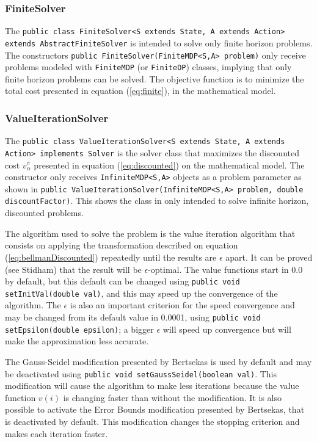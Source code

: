 \documentclass[11pt]{article}
\begin{document}
\subsubsection{FiniteSolver}

The \lstinline!public class FiniteSolver<S extends State, A extends Action> extends AbstractFiniteSolver! is intended to solve only finite horizon problems. The constructors \lstinline!public FiniteSolver(FiniteMDP<S,A> problem)!  only receive problems modeled with \lstinline!FiniteMDP! (or \lstinline!FiniteDP!) classes, implying that only finite horizon problems can be solved. The objective function is to minimize the total cost presented in equation (\ref{eq:finite}), in the mathematical model.

\subsubsection{ValueIterationSolver}

The \lstinline!public class ValueIterationSolver<S extends State, A extends Action> implements Solver! is the solver class that maximizes the discounted cost $v_\alpha^{\pi}$ presented in equation (\ref{eq:discounted}) on the mathematical model. The constructor  only receives \lstinline!InfiniteMDP<S,A>! objects as a problem parameter as shown in \lstinline!public ValueIterationSolver(InfiniteMDP<S,A> problem, double discountFactor)!. This shows the class in only intended to solve infinite horizon, discounted problems.

The algorithm used to solve the problem is the value iteration algorithm that consists on applying the transformation described on equation (\ref{eq:bellmanDiscounted}) repeatedly until the results are $\epsilon$ apart. It can be proved (see Stidham\cite{stidham}) that the result will be $\epsilon$-optimal. The value functions start in 0.0 by default, but this default can be changed using \lstinline!public void setInitVal(double val)!, and this may speed up the convergence of the algorithm. The $\epsilon$ is also an important criterion for the speed convergence and may be changed from its default value in 0.0001, using \lstinline!public void setEpsilon(double epsilon)!; a bigger $\epsilon$ will speed up convergence but will make the approximation less accurate.

The Gauss-Seidel modification presented by Bertsekas\cite{bertsekas} is used by default and may be deactivated using \lstinline!public void setGaussSeidel(boolean val)!. This modification will cause the algorithm to make less iterations because the value function $v(i)$ is changing faster than without the modification. It is also possible to activate the Error Bounds modification presented by Bertsekas\cite{bertsekas}, that is deactivated by default. This modification changes the stopping criterion and makes each iteration faster.
\end{document}
